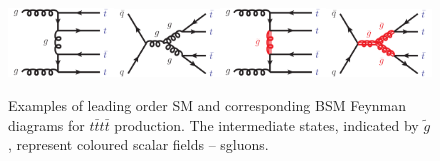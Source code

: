 \begin{figure}[t!]
\centering
\includegraphics[width=0.25\textwidth]{Feynman/gg2tttt}\includegraphics[width=0.25\textwidth]{Feynman/qq2tttt}\includegraphics[width=0.25\textwidth]{Feynman/gg2ttttsgluon}\includegraphics[width=0.25\textwidth]{Feynman/qq2ttttsgluon}
\caption{Examples of leading order SM and corresponding BSM Feynman diagrams for $t\bar{t}t\bar{t}$ production. The intermediate states, indicated by $\tilde{g}$, represent coloured scalar fields -- sgluons.}
\label{fig:LOtttt}
\end{figure}

